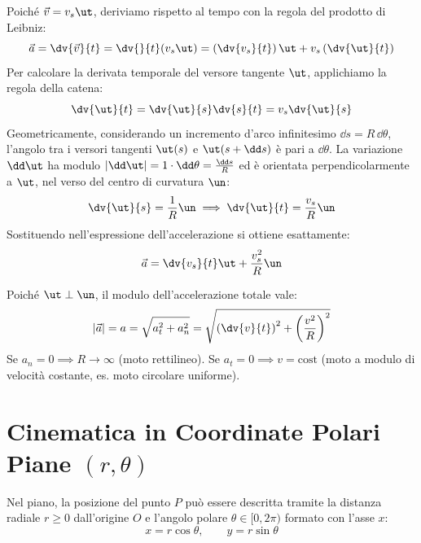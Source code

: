 \begin{dimostrazione}
Poiché $\vec{v} = v_s \ut$, deriviamo rispetto al tempo con la regola del prodotto di Leibniz:
\begin{equation}
    \vec{a} = \dv{\vec{v}}{t} = \dv{}{t}(v_s \ut) = \left(\dv{v_s}{t}\right)\ut + v_s \left(\dv{\ut}{t}\right)
\end{equation}
Per calcolare la derivata temporale del versore tangente $\ut$, applichiamo la regola della catena:
\begin{equation}
    \dv{\ut}{t} = \dv{\ut}{s} \dv{s}{t} = v_s \dv{\ut}{s}
\end{equation}
Geometricamente, considerando un incremento d'arco infinitesimo $\dd s = R\,\dd\theta$, l'angolo tra i versori tangenti $\ut(s)$ e $\ut(s+\dd s)$ è pari a $\dd\theta$. La variazione $\dd\ut$ ha modulo $|\dd\ut| = 1 \cdot \dd\theta = \frac{\dd s}{R}$ ed è orientata perpendicolarmente a $\ut$, nel verso del centro di curvatura $\un$:
\begin{equation}
    \dv{\ut}{s} = \frac{1}{R}\un \implies \dv{\ut}{t} = \frac{v_s}{R}\un
\end{equation}
Sostituendo nell'espressione dell'accelerazione si ottiene esattamente:
\begin{equation}
    \vec{a} = \dv{v_s}{t}\ut + \frac{v_s^2}{R}\un
\end{equation}
\end{dimostrazione}

\begin{osservazione}
Poiché $\ut \perp \un$, il modulo dell'accelerazione totale vale:
\begin{equation}
    |\vec{a}| = a = \sqrt{a_t^2 + a_n^2} = \sqrt{\left(\dv{v}{t}\right)^2 + \left(\frac{v^2}{R}\right)^2}
\end{equation}
Se $a_n = 0 \implies R \to \infty$ (moto rettilineo). Se $a_t = 0 \implies v = \text{cost}$ (moto a modulo di velocità costante, es. moto circolare uniforme).
\end{osservazione}

\section{Cinematica in Coordinate Polari Piane $(r, \theta)$}
\label{sec:coordinate_polari}

Nel piano, la posizione del punto $P$ può essere descritta tramite la distanza radiale $r \ge 0$ dall'origine $O$ e l'angolo polare $\theta \in [0, 2\pi)$ formato con l'asse $x$:
\begin{equation}
    x = r\cos\theta, \qquad y = r\sin\theta
\end{equation}

